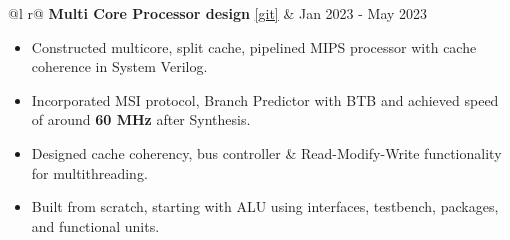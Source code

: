 \documentclass[a4paper,10pt]{article}
\begin{document}
\begin{tabularx}{\linewidth}{ @{}l r@{} }
    \textbf{Multi Core Processor design} \href{https://gitfront.io/r/Sharath/YQcLhKyPxPYD/CPU-desgin/}{[\underline{git}]} & \hfill {\small Jan 2023 - May 2023} \\[2.75pt]
    {
        \begin{minipage}[t]{\linewidth}
            \begin{itemize}[nosep, after=\strut, leftmargin=2em, itemsep=3pt]
                \item Constructed multicore, split cache, pipelined MIPS processor with cache coherence in System Verilog.
                \item Incorporated MSI protocol, Branch Predictor with BTB and achieved speed of around \textbf{60 MHz} after Synthesis.
                \item Designed cache coherency, bus controller \& Read-Modify-Write functionality for multithreading.
                \item Built from scratch, starting with ALU using interfaces, testbench, packages, and functional units. 
            \end{itemize}
        \end{minipage}
    }  
\end{tabularx}
\vspace{0.1cm}
\end{document}
